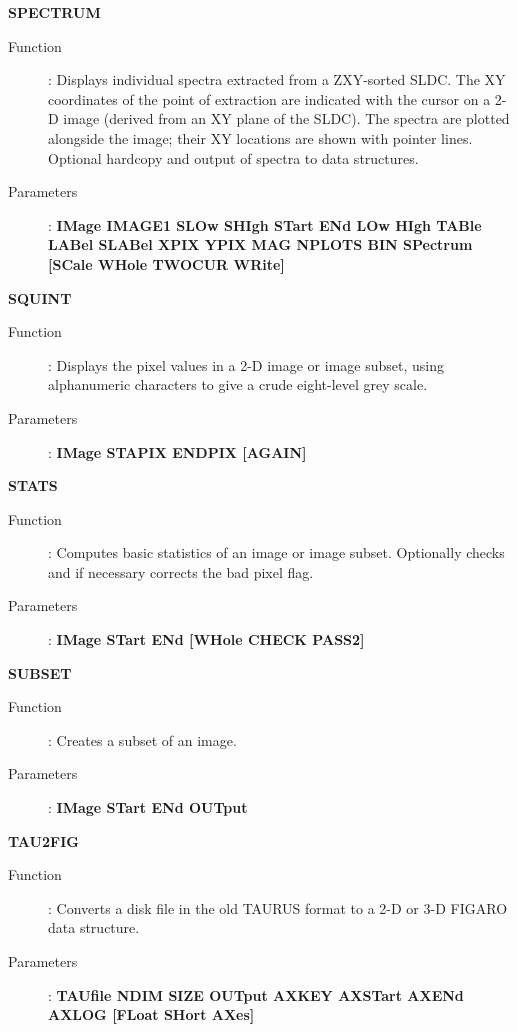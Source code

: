 {\large\bf SPECTRUM \hfill}
\begin{description}
\item[Function]:
Displays individual spectra extracted from a ZXY-sorted SLDC. The XY 
coordinates of the point of extraction are indicated with the cursor on a 2-D 
image (derived from an XY plane of the SLDC). The spectra are plotted alongside
the image; their XY locations are shown with pointer lines. Optional hardcopy
and output of spectra to data structures.
\item[Parameters]:
{\bf IMage IMAGE1 SLOw SHIgh STart ENd LOw HIgh TABle LABel SLABel XPIX YPIX 
MAG NPLOTS BIN SPectrum [SCale WHole TWOCUR WRite]}
\end{description}
\vspace{5mm}

{\large\bf SQUINT \hfill}
\begin{description}
\item[Function]: 
Displays the pixel values in a 2-D image or image subset, using alphanumeric
characters to give a crude eight-level grey scale.
\item[Parameters]: 
{\bf IMage STAPIX ENDPIX [AGAIN]}
\end{description}
\vspace{5mm}

{\large\bf STATS \hfill}
\begin{description}
\item[Function]: 
Computes basic statistics of an image or image subset. Optionally checks and
if necessary corrects the bad pixel flag.
\item[Parameters]: 
{\bf IMage STart ENd [WHole CHECK PASS2]}
\end{description}
\vspace{5mm}

{\large\bf SUBSET \hfill}
\begin{description}
\item[Function]: 
Creates a subset of an image.
\item[Parameters]: 
{\bf IMage STart ENd OUTput}
\end{description}
\vspace{5mm}

{\large\bf TAU2FIG \hfill}
\begin{description}
\item[Function]:
Converts a disk file in the old TAURUS format to a 2-D or 3-D FIGARO data 
structure.
\item[Parameters]:
{\bf TAUfile NDIM SIZE OUTput AXKEY AXSTart AXENd AXLOG [FLoat SHort AXes]}
\end{description}

